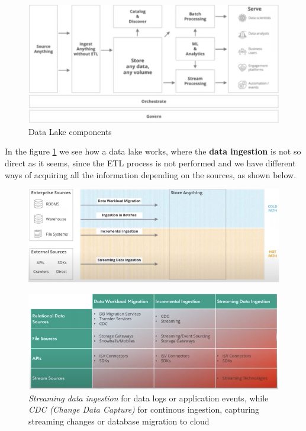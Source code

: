 \begin{figure}[ht!]
    \centering
    \includegraphics[scale=0.6]{images/data_lake_architecture.png}
    \caption{Data Lake components}
    \label{figDLstructure}
\end{figure}

In the figure \ref{figDLstructure} we see how a data lake works, where the \textbf{data ingestion} is not so direct as it seems, since the ETL process is not performed and we have different ways of acquiring all the information depending on the sources, as shown below.
\begin{figure}[ht!]
    \centering
    \includegraphics[scale=0.7]{images/DL_data_ingestion.png}
\end{figure}
\begin{figure}[ht!]
    \centering
    \includegraphics[scale=0.7]{images/DL_data_ingestion_options.png}
    \caption{\textit{Streaming data ingestion} for data logs or application events, while \textit{CDC (Change Data Capture)} for continous ingestion, capturing streaming changes or database migration to cloud}
\end{figure}

